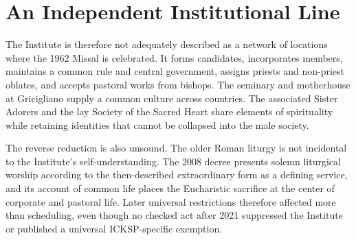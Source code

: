 \section{An Independent Institutional Line}


The Institute is therefore not adequately described as a network of locations where the 1962 Missal is celebrated. It forms candidates, incorporates members, maintains a common rule and central government, assigns priests and non-priest oblates, and accepts pastoral works from bishops. The seminary and motherhouse at Gricigliano supply a common culture across countries. The associated Sister Adorers and the lay Society of the Sacred Heart share elements of spirituality while retaining identities that cannot be collapsed into the male society.

The reverse reduction is also unsound. The older Roman liturgy is not incidental to the Institute's self-understanding. The 2008 decree presents solemn liturgical worship according to the then-described extraordinary form as a defining service, and its account of common life places the Eucharistic sacrifice at the center of corporate and pastoral life. Later universal restrictions therefore affected more than scheduling, even though no checked act after 2021 suppressed the Institute or published a universal ICKSP-specific exemption.

